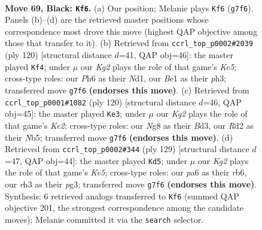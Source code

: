 \documentclass[11pt]{article}
\begin{document}
\clearpage

\begin{figure}[p]\centering
\begin{subfigure}{0.46\textwidth}\centering
\resizebox{\linewidth}{!}{%
\newchessgame
\chessboard[
  setfen={6n1/pR4k1/P6p/1P3p2/b4P2/7R/3r4/4b1K1 b - - 8 69},
  showmover=false,
  pgfstyle=straightmove, color=movearrow, markmove={g7-f6}
]}
\caption{}
\end{subfigure}\hfill
\begin{subfigure}{0.46\textwidth}\centering
\resizebox{\linewidth}{!}{%
\newchessgame
\chessboard[
  setfen={4r3/8/8/1p2K2k/1P2N1p1/1P5p/2P3rP/3N3R w - - 36 61},
  showmover=false,
  pgfstyle=straightmove, color=movearrow, markmove={e5-f4}
]}
\caption{}
\end{subfigure}
\\[4pt]
\begin{subfigure}{0.46\textwidth}\centering
\resizebox{\linewidth}{!}{%
\newchessgame
\chessboard[
  setfen={1k6/1p2R3/4p3/pN5p/3P4/3B3P/1r2K3/6r1 w - - 19 61},
  showmover=false,
  pgfstyle=straightmove, color=movearrow, markmove={e2-e3}
]}
\caption{}
\end{subfigure}\hfill
\begin{subfigure}{0.46\textwidth}\centering
\resizebox{\linewidth}{!}{%
\newchessgame
\chessboard[
  setfen={8/4R3/1R4p1/7p/3nk2P/6PK/1pr5/8 b - - 17 65},
  showmover=false,
  pgfstyle=straightmove, color=movearrow, markmove={e4-d5}
]}
\caption{}
\end{subfigure}
\caption{\textbf{Move 69, Black: \texttt{Kf6}.} (a) Our position; Melanie plays \texttt{Kf6} (\texttt{g7f6}). Panels (b)--(d) are the retrieved master positions whose correspondence most drove this move (highest QAP objective among those that transfer to it). (b) Retrieved from \texttt{ccrl\_top\_p0002\#2039} (ply 120) [structural distance $d$=41, QAP obj=46]: the master played \texttt{Kf4}; under $\mu$ our \emph{Kg2} plays the role of that game's \emph{Ke5}; cross-type roles: our \emph{P}h6 as their \emph{N}d1, our \emph{B}e1 as their \emph{p}h3; transferred move \texttt{g7f6} \textbf{(endorses this move)}. (c) Retrieved from \texttt{ccrl\_top\_p0001\#1082} (ply 120) [structural distance $d$=46, QAP obj=45]: the master played \texttt{Ke3}; under $\mu$ our \emph{Kg2} plays the role of that game's \emph{Ke2}; cross-type roles: our \emph{N}g8 as their \emph{B}d3, our \emph{R}d2 as their \emph{N}b5; transferred move \texttt{g7f6} \textbf{(endorses this move)}. (d) Retrieved from \texttt{ccrl\_top\_p0002\#344} (ply 129) [structural distance $d$=47, QAP obj=44]: the master played \texttt{Kd5}; under $\mu$ our \emph{Kg2} plays the role of that game's \emph{Ke5}; cross-type roles: our \emph{p}a6 as their \emph{r}b6, our \emph{r}h3 as their \emph{p}g3; transferred move \texttt{g7f6} \textbf{(endorses this move)}. Synthesis: 6 retrieved analogs transferred to \texttt{Kf6} (summed QAP objective 201, the strongest correspondence among the candidate moves); Melanie committed it via the \texttt{search} selector.}
\label{fig:thought-m137}
\end{figure}
\end{document}
